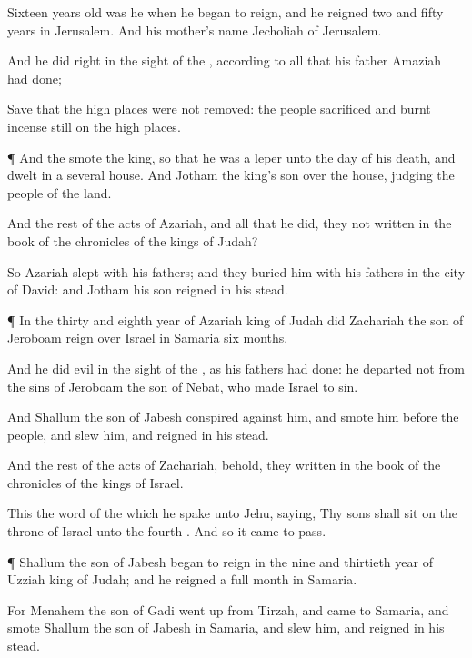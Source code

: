 {Sixteen
years
old was he when he began to
reign, and he
reigned
two and
fifty
years in
Jerusalem. And his
mother’s
name
{}
Jecholiah of
Jerusalem.

And he
did
{}
right in the
sight of the
{}, according to all that his
father
Amaziah had
done;

Save that the high
places were not
removed: the
people
sacrificed and burnt
incense still on the high
places.


\par }{\PP {}¶ And the
{}
smote the
king, so that he was a
leper unto the
day of his
death, and
dwelt in a
several
house. And
Jotham the
king’s
son
{} over the
house,
judging the
people of the
land.

And the
rest of the
acts of
Azariah, and all that he
did,
{} they not
written in the
book of the
chronicles of the
kings of
Judah?

So
Azariah
slept with his
fathers; and they
buried him with his
fathers in the
city of
David: and
Jotham his
son
reigned in his stead.


\par }{\PP {}¶ In the
thirty and
eighth
year of
Azariah
king of
Judah did
Zachariah the
son of
Jeroboam
reign over
Israel in
Samaria
six
months.

And he
did
{}
evil in the
sight of the
{}, as his
fathers had
done: he
departed not from the
sins of
Jeroboam the
son of
Nebat, who made
Israel to
sin.

And
Shallum the
son of
Jabesh
conspired against him, and
smote him
before the
people, and
slew him, and
reigned in his stead.

And the
rest of the
acts of
Zachariah, behold, they
{}
written in the
book of the
chronicles of the
kings of
Israel.

This
{} the
word of the
{} which he
spake unto
Jehu,
saying, Thy
sons shall
sit on the
throne of
Israel unto the
fourth
{}. And so it came to pass.


\par }{\PP {}¶
Shallum the
son of
Jabesh began to
reign in the
nine and
thirtieth
year of
Uzziah
king of
Judah; and he
reigned a
full
month in
Samaria.

For
Menahem the
son of
Gadi went
up from
Tirzah, and
came to
Samaria, and
smote
Shallum the
son of
Jabesh in
Samaria, and
slew him, and
reigned in his stead.

}
